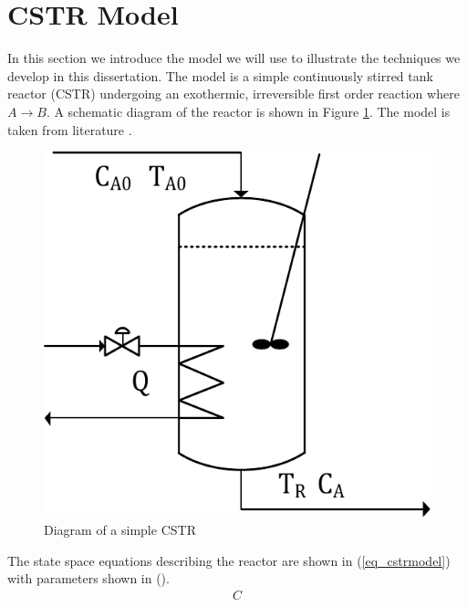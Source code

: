 \documentclass[../masters.tex]{subfiles}
\begin{document}
\graphicspath{{./imgs/}{../imgs/}} %

\section{CSTR Model}
In this section we introduce the model we will use to illustrate the techniques we develop in this dissertation. The model is a simple continuously stirred tank reactor (CSTR) undergoing an exothermic, irreversible first order reaction where $A \rightarrow B$. A schematic diagram of the reactor is shown in Figure \ref{fig_cstr_diagram}. The model is taken from literature \cite{cstrmodel}.
\begin{figure}[H] 
\centering
\includegraphics[scale=0.8]{cstr_diagram.pdf}
\caption{Diagram of a simple CSTR}
\label{fig_cstr_diagram}
\end{figure}
The state space equations describing the reactor are shown in (\ref{eq_cstrmodel}) with parameters shown in ().
\begin{equation}
\begin{aligned}
C
\end{aligned}
\label{eq_cstrmodel}
\end{equation}





\end{document}
